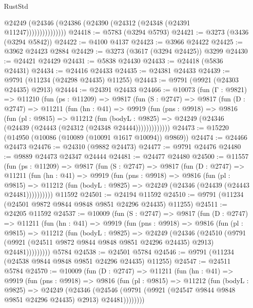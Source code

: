 \begin{lexlean}{RustStd}
\begin{coremodule}
                    @24249 (@24346 (@24386 (@24390 (@24312 (@24348 (@24391 @11247)))))))))))))))
@24418 := @5783 (@3294 @5793)
@24421 := @3273 (@3436 (@3294 @5842))
@24422 := @4100 @4137
@24423 := @3966 @24422
@24425 := @3962 @24423 @2884
@24429 := @3273 (@3617 (@3294 @24425)) @3299
@24430 := @24421 @24429
@24431 := @5838 @24430
@24433 := @24418 (@5836 @24431)
@24434 := @24416 @24433
@24435 := @24381 @24433
@24439 := @9791 (@11234 (@24298 @24435) @11255)
@24443 := @9791 (@9921 (@24303 @24435) @2913)
@24444 := @24391 @24433
@24466 := @10073
    (fun (Γ : @9821) =>
    @11210
      (fun (ps : @11209) =>
      @9817
        (fun (S : @2747) =>
        @9817
          (fun (D : @2747) =>
          @11211
            (fun (hn : @41) =>
            @9919
              (fun (pns : @9918) =>
              @9816
                (fun (pl : @9815) =>
                @11212
                  (fun (bodyL : @9825) =>
                  @24249 (@24346 (@24439 (@24443 (@24312 (@24348 @24444)))))))))))))
@24473 := @15220 (@14950 (@10086 (@10089 (@10091 @1617 @10094)) @9869))
@24474 := @24466 @24473
@24476 := @24310 (@9882 @24473)
@24477 := @9791 @24476
@24480 := @9889 @24473 @24347 @24444
@24481 := @24477 @24480
@24500 := @11557
    (fun (ps : @11209) =>
    @9817
      (fun (S : @2747) =>
      @9817
        (fun (D : @2747) =>
        @11211
          (fun (hn : @41) =>
          @9919
            (fun (pns : @9918) =>
            @9816
              (fun (pl : @9815) =>
              @11212 (fun (bodyL : @9825) => @24249 (@24346 (@24439 (@24443 @24481))))))))))
    @11592
@24501 := @24194 @11592
@24510 := @9791 (@11234 (@24501 @9872 @9844 @9848 @9851 @24296 @24435) @11255)
@24511 := @24205 @11592
@24537 := @10009
    (fun (S : @2747) =>
    @9817
      (fun (D : @2747) =>
      @11211
        (fun (hn : @41) =>
        @9919
          (fun (pns : @9918) =>
          @9816
            (fun (pl : @9815) =>
            @11212
              (fun (bodyL : @9825) =>
              @24249
                (@24346
                  (@24510
                    (@9791
                      (@9921 (@24511 @9872 @9844 @9848 @9851 @24296 @24435) @2913)
                      @24481)))))))))
    @5784
@24538 := @24501 @5784
@24546 := @9791 (@11234 (@24538 @9844 @9848 @9851 @24296 @24435) @11255)
@24547 := @24511 @5784
@24570 := @10009
    (fun (D : @2747) =>
    @11211
      (fun (hn : @41) =>
      @9919
        (fun (pns : @9918) =>
        @9816
          (fun (pl : @9815) =>
          @11212
            (fun (bodyL : @9825) =>
            @24249
              (@24346
                (@24546 (@9791 (@9921 (@24547 @9844 @9848 @9851 @24296 @24435) @2913) @24481))))))))

\end{coremodule}
\end{lexlean}
